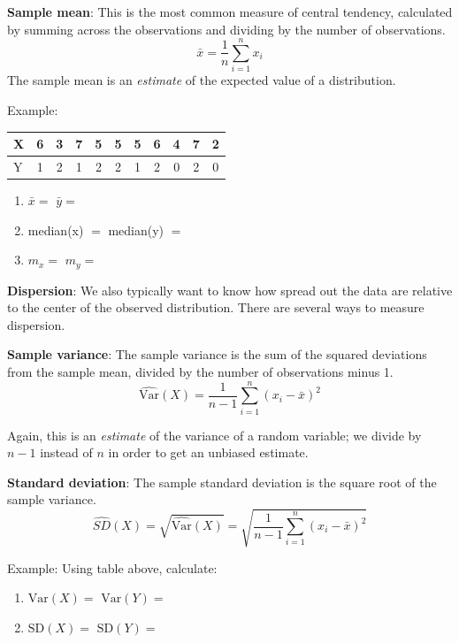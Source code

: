 \documentclass[
]{book}
\newcommand{\SD}{\mathrm{SD}}
\theoremstyle{definition}
\theoremstyle{definition}
\theoremstyle{definition}
\theoremstyle{remark}
\begin{document}
\textbf{Sample mean}: This is the most common measure of central tendency, calculated by summing across the observations and dividing by the number of observations.
\[\bar{x} = \frac{1}{n}\sum_{i=1}^{n}x_i\]
The sample mean is an \emph{estimate} of the expected value of a distribution.

\begin{framed}
Example:  
\begin{center}
\begin{tabular}{|l|cccccccccc|}
\hline
X & 6 & 3 & 7 & 5 & 5 & 5 & 6 & 4 & 7 & 2\\
\hline
Y & 1 & 2 & 1 & 2 & 2 & 1 & 2 & 0 & 2 & 0\\
\hline
\end{tabular}
\end{center}

\begin{enumerate}
\item $\bar{x} = $ \hspace{3.1cm} $\bar{y} = $
\item median(x) $ = $ \hspace{1.5cm} median(y) $ = $
\item $m_x = $ \hspace{2.75cm} $m_y =$\\
\end{enumerate}
\end{framed}

\textbf{Dispersion}: We also typically want to know how spread out the data are relative to the center of the observed distribution. There are several ways to measure dispersion.

\textbf{Sample variance}: The sample variance is the sum of the squared deviations from the sample mean, divided by the number of observations minus 1.
\[ \hat{\text{Var}}(X) = \frac{1}{n-1}\sum_{i = 1}^n (x_i - \bar{x})^2\]

Again, this is an \emph{estimate} of the variance of a random variable; we divide by \(n - 1\) instead of \(n\) in order to get an unbiased estimate.

\textbf{Standard deviation}: The sample standard deviation is the square root of the sample variance.
\[ \hat{SD}(X) = \sqrt{\hat{\text{Var}}(X)} = \sqrt{\frac{1}{n-1}\sum_{i = 1}^n (x_i - \bar{x})^2}\]

\begin{framed}
Example: Using table above, calculate: 
\begin{enumerate}
\item $\text{Var}(X) = $ \hspace{1.5cm} $\text{Var}(Y) =$
\item $\SD(X) = $ \hspace{1.65cm} $\SD(Y) =$
\end{enumerate}
\end{framed}
\end{document}
